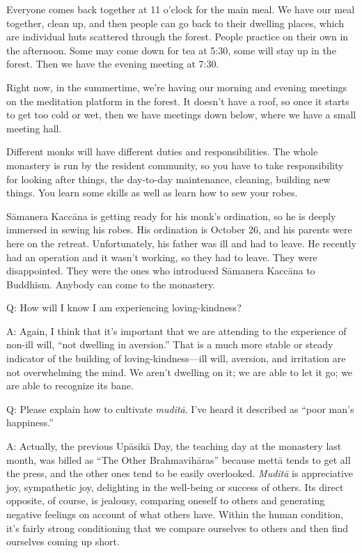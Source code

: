 Everyone comes back together at 11 o’clock for the main meal. We have
our meal together, clean up, and then people can go back to their
dwelling places, which are individual huts scattered through the forest.
People practice on their own in the afternoon. Some may come down for
tea at 5:30, some will stay up in the forest. Then we have the evening
meeting at 7:30.

Right now, in the summertime, we’re having our morning and evening
meetings on the meditation platform in the forest. It doesn’t have a
roof, so once it starts to get too cold or wet, then we have meetings
down below, where we have a small meeting hall.

Different monks will have different duties and responsibilities. The
whole monastery is run by the resident community, so you have to take
responsibility for looking after things, the day-to-day maintenance,
cleaning, building new things. You learn some skills as well as learn
how to sew your robes.

Sāmanera Kaccāna is getting ready for his monk’s ordination, so he is
deeply immersed in sewing his robes. His ordination is October 26, and
his parents were here on the retreat. Unfortunately, his father was ill
and had to leave. He recently had an operation and it wasn’t working, so
they had to leave. They were disappointed. They were the ones who
introduced Sāmanera Kaccāna to Buddhism. Anybody can come to the
monastery.

\qaspace
Q: How will I know I am experiencing loving-kindness?

\qaspace
A: Again, I think that it’s important that we are attending to the
experience of non-ill will, “not dwelling in aversion.” That is a much
more stable or steady indicator of the building of loving-kindness—ill
will, aversion, and irritation are not overwhelming the mind. We aren’t
dwelling on it; we are able to let it go; we are able to recognize its
bane.

\qaspace
Q: Please explain how to cultivate \emph{muditā}. I’ve heard it
described as “poor man’s happiness.”

\qaspace
A: Actually, the previous Upāsikā Day, the teaching day at the monastery
last month, was billed as “The Other Brahmavihāras” because mettā tends
to get all the press, and the other ones tend to be easily overlooked.
\emph{Muditā} is appreciative joy, sympathetic joy, delighting in the
well-being or success of others. Its direct opposite, of course, is
jealousy, comparing oneself to others and generating negative feelings
on account of what others have. Within the human condition, it’s fairly
strong conditioning that we compare ourselves to others and then find
ourselves coming up short.

